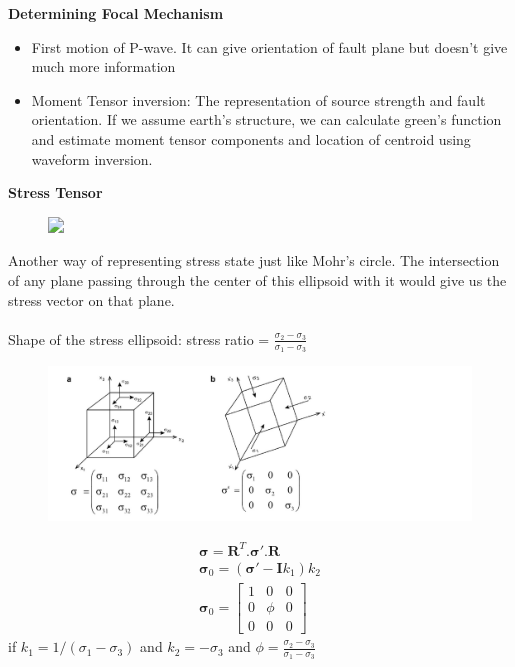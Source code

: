\documentclass[11pt]{beamer}
\begin{document}
\begin{frame}{\textbf{Determining Focal Mechanism}}
    \begin{itemize}
        \item<1-> First motion of P-wave. It can give orientation of fault plane but doesn't give much more information
        \item<2-> Moment Tensor inversion: The representation of source strength and fault orientation. If we assume earth's structure, we can calculate green's function and estimate moment tensor components and location of centroid using waveform inversion.
    \end{itemize}
\end{frame}

\begin{frame}{\textbf{Stress Tensor}}
    \begin{figure}
        \includegraphics<1->[width=0.7\linewidth]{images/stressellipse}
    \end{figure}

    \pause%
    
    Another way of representing stress state just like Mohr's circle. The intersection of any plane passing through the center of this ellipsoid with it would give us the stress vector on that plane.
    \\~\\
    Shape of the stress ellipsoid: stress ratio = $\frac{\sigma_2 - \sigma_3}{\sigma_1 - \sigma_3}$
\end{frame}

\begin{frame}
    \begin{figure}
        \centering
        \includegraphics[width=1\linewidth]{images/obliquestress}
    \end{figure}

    \pause%

    \begin{align*}
        \mathbf{\sigma} = \mathbf{R}^T.\mathbf{\sigma'}.\mathbf{R} \\
        \mathbf{\sigma}_0 = (\mathbf{\sigma'} - \mathbf{I}k_1)k_2 \\
        \mathbf{\sigma}_0 = 
        \begin{bmatrix}
            1 & 0 & 0 \\
            0 & \phi & 0 \\
            0 & 0 & 0
        \end{bmatrix}
    \end{align*}
    if $k_1 = 1/(\sigma_1 - \sigma_3)$ and $k_2 = -\sigma_3$ and $\phi = \frac{\sigma_2 - \sigma_3}{\sigma_1 - \sigma_3}$

\end{frame}
\end{document}
